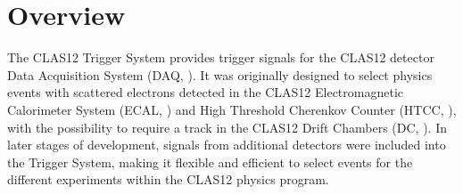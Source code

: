 \section{Overview}

The CLAS12 Trigger System provides trigger signals for the CLAS12 detector Data Acquisition System (DAQ, \cite{daq-ref}). It was originally designed to select physics events with scattered electrons detected in the CLAS12 Electromagnetic Calorimeter System (ECAL, \cite{ec-ref}) and High Threshold Cherenkov Counter (HTCC, \cite{htcc-ref}), with the possibility to require a track in the CLAS12 Drift Chambers (DC, \cite{dc-ref}). In later stages of development, signals from additional detectors were included into the Trigger System, making it flexible and efficient to select events for the different experiments within the CLAS12 physics program.




